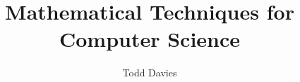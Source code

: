 \newcommand{\coursename}{Mathematical Techniques for Computer Science}
\newcommand{\coursecode}{COMP11120}
\newcommand{\courseinfo}{}
\newcommand{\Author}{Todd Davies} 
\newcommand{\Title}{\coursename}
\author{\Author}
\title{\Title}

